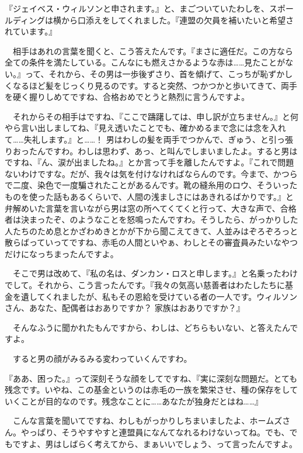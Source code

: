 \documentclass[tate,paper=b6j,jafontsize=9pt]{jlreq}
\begin{document}
『ジェイベス・ウィルソンと申されます。』と、まごついていたわしを、スポールディングは横から口添えをしてくれました。『連盟の欠員を補いたいと希望されています。』

　相手はあれの言葉を聞くと、こう答えたんです。『まさに適任だ。この方なら全ての条件を満たしている。こんなにも燃えさかるような赤は……見たことがない。』って、それから、その男は一歩後ずさり、首を傾げて、こっちが恥ずかしくなるほど髪をじっくり見るのです。すると突然、つかつかと歩いてきて、両手を硬く握りしめてですね、合格おめでとうと熱烈に言うんですよ。


　それからその相手はですね、『ここで躊躇しては、申し訳が立ちません。』と何やら言い出しましてね、『見え透いたことでも、確かめるまで念には念を入れて……失礼します。』と……！ 男はわしの髪を両手でつかんで、ぎゅう、と引っ張りおったんですわ。わしは思わず、あっ、と叫んでしまいましたよ。すると男はですね、『ん、涙が出ましたね。』とか言って手を離したんですよ。『これで問題ないわけですな。だが、我々は気を付けなければならんのです。今まで、かつらで二度、染色で一度騙されたことがあるんです。靴の縫糸用のロウ、そういったものを使った話もあるくらいで、人間の浅ましさにはあきれるばかりです。』と弁解めいた言葉を言いながら男は窓の所へてくてくと行って、大きな声で、合格者は決まったぞ、のようなことを怒鳴ったんですわ。そうしたら、がっかりした人たちのため息とかざわめきとかが下から聞こえてきて、人並みはぞろぞろっと散らばっていってですね、赤毛の人間といやぁ、わしとその審査員みたいなやつだけになっちまったんですよ。

　そこで男は改めて、『私の名は、ダンカン・ロスと申します。』と名乗ったわけでして。それから、こう言ったんです。『我々の気高い慈善者はわたしたちに基金を遺してくれましたが、私もその恩給を受けている者の一人です。ウィルソンさん、あなた、配偶者はおありですか？ 家族はおありですか？』

　そんなふうに聞かれたもんですから、わしは、どちらもいない、と答えたんですよ。

　すると男の顔がみるみる変わっていくんですわ。

『ああ、困った。』って深刻そうな顔をしてですね、『実に深刻な問題だ。とても残念です。いやね、この基金というのは赤毛の一族を繁栄させ、種の保存をしていくことが目的なのです。残念なことに……あなたが独身だとはね……』

　こんな言葉を聞いてですね、わしもがっかりしちまいましたよ、ホームズさん。やっぱり、そうやすやすと連盟員になんてなれるわけないってね。でも、でもですよ、男はしばらく考えてから、まぁいいでしょう、って言ったんですよ。
\end{document}
